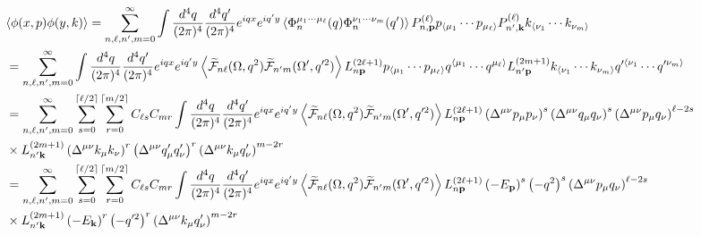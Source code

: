 \documentclass[aps,prd,preprint,nofootinbib,amsmath,amssymb,showpacs,longbibliography,singlecolumn,superscriptaddress,10pt]{revtex4-1}
\theoremstyle{plain}
\theoremstyle{definition}
\begin{document}
\begin{equation}
\hspace{-1cm}
\begin{aligned}
&\langle \phi(x,p) \phi(y,k)  \rangle 
=
\sum_{n,\ell, n',m = 0}^{\infty}
\int \frac{d^{4}q}{(2 \pi)^{4}}  \frac{d^{4}q'}{(2 \pi)^{4}} e^{iqx} e^{iq'y} \left\langle \Phi_{n}^{\mu_{1} \cdots \mu_{\ell}}(q) \Phi_{n}^{\nu_{1} \cdots \nu_{m}}(q') \right\rangle P_{n,{\bf p}}^{(\ell)} p_{\langle \mu_{1}} \cdots p_{ \mu_{\ell} \rangle}
P_{n',{\bf k}}^{(\ell)} k_{\langle \nu_{1}} \cdots k_{ \nu_{m} \rangle}
\\
&
=
\sum_{n,\ell, n',m = 0}^{\infty} 
\int \frac{d^{4}q}{(2 \pi)^{4}}  \frac{d^{4}q'}{(2 \pi)^{4}} e^{iqx} e^{iq'y} \left\langle \widetilde{\mathcal{F}}_{n\ell}(\Omega, q^{2})
\widetilde{\mathcal{F}}_{n'm}(\Omega', q'^{2})\right\rangle L^{(2 \ell + 1)}_{n {\bf p}} p_{\langle \mu_{1}} \cdots p_{ \mu_{\ell} \rangle} q^{\langle \mu_{1}} \cdots q^{\mu_{\ell} \rangle}
L^{(2 m + 1)}_{n' {\bf p}} k_{\langle \nu_{1}} \cdots k_{ \nu_{m} \rangle} q'^{\langle \nu_{1}} \cdots q'^{\nu_{m} \rangle}
\\
&
=
\sum_{n,\ell, n',m = 0}^{\infty} \sum_{s=0}^{\lceil \ell / 2 \rceil} \sum_{r=0}^{\lceil m / 2 \rceil} C_{\ell s}
 C_{m r}
\int \frac{d^{4}q}{(2 \pi)^{4}}  \frac{d^{4}q'}{(2 \pi)^{4}} e^{iqx} e^{iq'y}  \left\langle \widetilde{\mathcal{F}}_{n\ell}(\Omega, q^{2})
\widetilde{\mathcal{F}}_{n'm}(\Omega', q'^{2})\right\rangle L^{(2 \ell + 1)}_{n {\bf p}}  \left(\Delta^{\mu \nu} p_{\mu} p_{\nu}\right)^{s} \left(\Delta^{\mu \nu} q_{\mu} q_{\nu}\right)^{s} 
\left(\Delta^{\mu \nu} p_{\mu} q_{\nu}\right)^{\ell - 2s}
\\
&
\times
L^{(2 m + 1)}_{n' {\bf k}} \left(\Delta^{\mu \nu} k_{\mu} k_{\nu}\right)^{r} \left(\Delta^{\mu \nu} q'_{\mu} q'_{\nu}\right)^{r}
\left(\Delta^{\mu \nu} k_{\mu} q'_{\nu}\right)^{m - 2r}
\\
&
=
\sum_{n,\ell, n',m = 0}^{\infty} \sum_{s=0}^{\lceil \ell / 2 \rceil} \sum_{r=0}^{\lceil m / 2 \rceil} C_{\ell s}
 C_{m r}
\int \frac{d^{4}q}{(2 \pi)^{4}}  \frac{d^{4}q'}{(2 \pi)^{4}} e^{iqx} e^{iq'y}  \left\langle \widetilde{\mathcal{F}}_{n\ell}(\Omega, q^{2})
\widetilde{\mathcal{F}}_{n'm}(\Omega', q'^{2})\right\rangle L^{(2 \ell + 1)}_{n {\bf p}}  \left(-E_{\bf p}\right)^{s} \left(-q^{2}\right)^{s} 
\left(\Delta^{\mu \nu} p_{\mu} q_{\nu}\right)^{\ell - 2s}
\\
&
\times
L^{(2 m + 1)}_{n' {\bf k}} \left(-E_{\bf k}\right)^{r} \left(-q'^{2}\right)^{r}
\left(\Delta^{\mu \nu} k_{\mu} q'_{\nu}\right)^{m - 2r}
\end{aligned}    
\end{equation}
\end{document}
